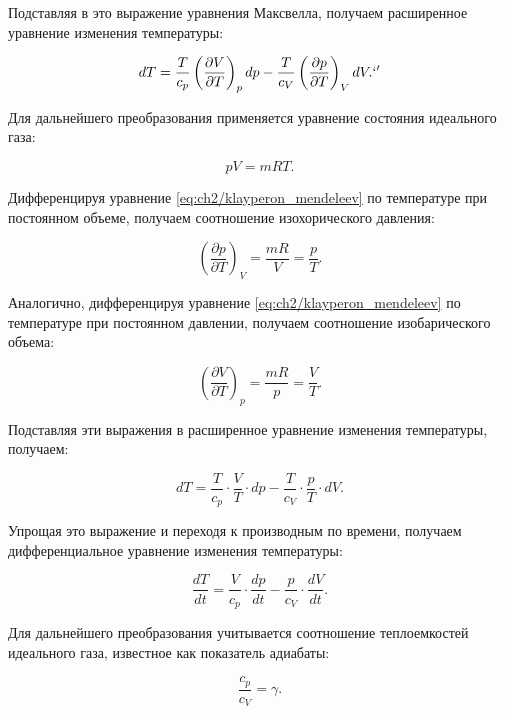 Подставляя в это выражение уравнения Максвелла, получаем расширенное уравнение изменения температуры:

\begin{equation*}
    dT = \frac{T}{c_p} \left(\frac{\partial V}{\partial T}\right)_p dp - \frac{T}{c_V} \left(\frac{\partial p}{\partial T}\right)_V dV.`'
\end{equation*}

Для дальнейшего преобразования применяется уравнение состояния идеального газа:

\begin{equation}\label{eq:ch2/klayperon_mendeleev}
    pV = mRT.
\end{equation}

Дифференцируя уравнение \eqref{eq:ch2/klayperon_mendeleev} по температуре при постоянном объеме, получаем соотношение изохорического давления:

\begin{equation*}
    \left(\frac{\partial p}{\partial T}\right)_V = \frac{mR}{V} = \frac{p}{T}.
\end{equation*}

Аналогично, дифференцируя уравнение \eqref{eq:ch2/klayperon_mendeleev} по температуре при постоянном давлении,
получаем соотношение изобарического объема:

\begin{equation*}
    \left(\frac{\partial V}{\partial T}\right)_p = \frac{mR}{p} = \frac{V}{T}.
\end{equation*}

Подставляя эти выражения в расширенное уравнение изменения температуры, получаем:

\begin{equation*}
    dT = \frac{T}{c_p} \cdot \frac{V}{T} \cdot dp - \frac{T}{c_V} \cdot \frac{p}{T} \cdot dV.
\end{equation*}

Упрощая это выражение и переходя к производным по времени, получаем дифференциальное уравнение изменения температуры:

\begin{equation*}
    \frac{dT}{dt} = \frac{V}{c_p} \cdot \frac{dp}{dt} - \frac{p}{c_V} \cdot \frac{dV}{dt}.
\end{equation*}

Для дальнейшего преобразования учитывается соотношение теплоемкостей идеального газа, известное как показатель адиабаты:

\begin{equation*}
    \frac{c_p}{c_V} = \gamma.
\end{equation*}

